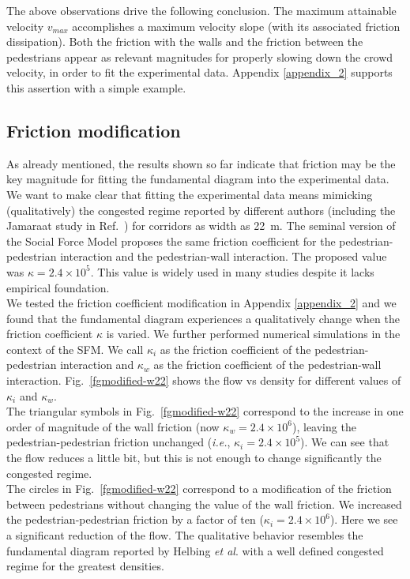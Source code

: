 The above observations drive the following conclusion. The maximum attainable velocity $v_{max}$ accomplishes a maximum velocity slope (with its associated friction dissipation). Both the friction with the walls and the friction between the pedestrians appear as relevant magnitudes for properly slowing down the crowd velocity, in order to fit the experimental data. Appendix \ref{appendix_2} supports this assertion with a simple example.  

\subsection{Friction modification}

As already mentioned, the results shown so far indicate that friction may be the key magnitude for fitting the fundamental diagram into the experimental data. We want to make clear that fitting the experimental data means mimicking (qualitatively) the congested regime reported by different authors (including the Jamaraat study in Ref.~\cite{helbing3}) for corridors as width as 22~m. The seminal version of the Social Force Model proposes the same friction coefficient for the pedestrian-pedestrian interaction and the pedestrian-wall interaction. The proposed value was $\kappa = 2.4\times10^{5}$. This value is widely used in many studies despite it lacks empirical foundation. \\

We tested the friction coefficient modification in Appendix \ref{appendix_2} and we found that the fundamental diagram experiences a qualitatively change when the friction coefficient $\kappa$ is varied. We further performed numerical simulations in the context of the SFM. We call $\kappa_i$ as the friction coefficient of the pedestrian-pedestrian interaction and $\kappa_w$ as the friction coefficient of the pedestrian-wall interaction. Fig.~\ref{fgmodified-w22} shows the flow vs density for different values of $\kappa_i$ and $\kappa_w$.\\

The triangular symbols in Fig.~\ref{fgmodified-w22} correspond to the increase in one order of magnitude of the wall friction (now $\kappa_w = 2.4\times10^{6}$), leaving the pedestrian-pedestrian friction unchanged (\textit{i.e.}, $\kappa_i = 2.4\times10^{5}$). We can see that the flow reduces a little bit, but this is not enough to change significantly the congested regime. \\

The circles in Fig.~\ref{fgmodified-w22} correspond to a modification of the friction between pedestrians without changing the value of the wall friction. We increased the pedestrian-pedestrian friction by a factor of ten ($\kappa_i = 2.4\times10^{6}$). Here we see a significant reduction of the flow. The qualitative behavior resembles the fundamental diagram reported by Helbing \textit{et al}. with a well defined congested regime for the greatest densities.\\

